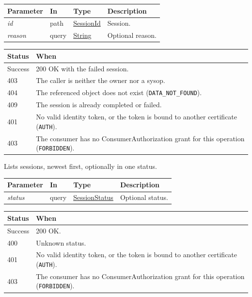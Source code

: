 \documentclass[a4paper]{arrowhead}
\newcommand{\fparam}[1]{\textit{\textcolor{ArrowheadBlue}{#1}}}
\newcommand{\mref}[1]{{\textcolor{ArrowheadPurple}{\hyperref[sec:model:#1]{#1}}}}
\newcommand{\pref}[1]{{\textcolor{ArrowheadGrey}{\hyperref[sec:model:primitives:#1]{#1}}}}
\begin{document}
{\small
\begin{longtable}{|p{3.0cm}|p{1.4cm}|p{3.2cm}|p{8.2cm}|}

\hline
\rowcolor{gray!33} Parameter & In & Type & Description \\ \hline
\endhead
\fparam{id} & path & \pref{SessionId} & Session. \\ \hline
\fparam{reason} & query & \pref{String} & Optional reason. \\ \hline
\end{longtable}
}


{\small
\begin{longtable}{|p{2.0cm}|p{13.8cm}|}

\hline
\rowcolor{gray!33} Status & When \\ \hline
\endhead
Success & 200 OK with the failed session. \\ \hline
403 & The caller is neither the owner nor a sysop. \\ \hline
404 & The referenced object does not exist (\texttt{DATA\_\allowbreak{}NOT\_\allowbreak{}FOUND}). \\ \hline
409 & The session is already completed or failed. \\ \hline
401 & No valid identity token, or the token is bound to another certificate (\texttt{AUTH}). \\ \hline
403 & The consumer has no ConsumerAuthorization grant for this operation (\texttt{FORBIDDEN}). \\ \hline
\end{longtable}
}

Lists sessions, newest first, optionally in one status.

{\small
\begin{longtable}{|p{3.0cm}|p{1.4cm}|p{3.2cm}|p{8.2cm}|}

\hline
\rowcolor{gray!33} Parameter & In & Type & Description \\ \hline
\endhead
\fparam{status} & query & \mref{SessionStatus} & Optional status. \\ \hline
\end{longtable}
}


{\small
\begin{longtable}{|p{2.0cm}|p{13.8cm}|}

\hline
\rowcolor{gray!33} Status & When \\ \hline
\endhead
Success & 200 OK. \\ \hline
400 & Unknown status. \\ \hline
401 & No valid identity token, or the token is bound to another certificate (\texttt{AUTH}). \\ \hline
403 & The consumer has no ConsumerAuthorization grant for this operation (\texttt{FORBIDDEN}). \\ \hline
\end{longtable}
}
\end{document}
